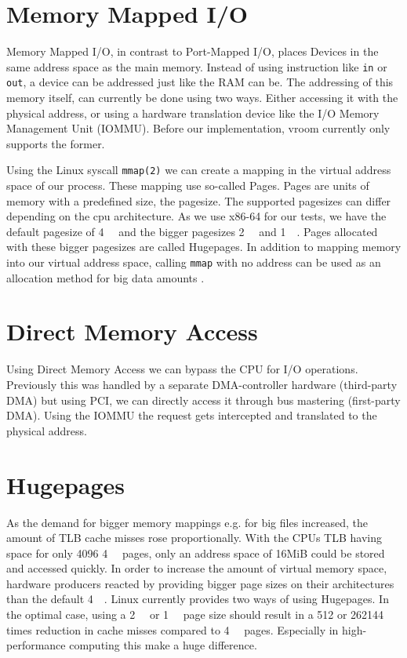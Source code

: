 \section{Memory Mapped I/O}
Memory Mapped I/O, in contrast to Port-Mapped I/O, places Devices in the same address space as the main memory. Instead of using instruction like \texttt{in} or \texttt{out}, a device can be addressed just like the RAM can be. The addressing of this memory itself, can currently be done using two ways. Either accessing it with the physical address, or using a hardware translation device like the I/O Memory Management Unit (IOMMU). Before our implementation, vroom currently only supports the former. %

Using the Linux syscall \texttt{mmap(2)} we can create a mapping in the virtual address space of our process. These mapping use so-called Pages. Pages are units of memory with a predefined size, the pagesize. The supported pagesizes can differ depending on the cpu architecture. As we use x86-64 for our tests, we have the default pagesize of \qty{4}{\kibi\byte} and the bigger pagesizes \qty{2}{\mebi\byte} and \qty{1}{\gibi\byte}. Pages allocated with these bigger pagesizes are called Hugepages. In addition to mapping memory into our virtual address space, calling \texttt{mmap} with no address can be used as an allocation method for big data amounts \cite{mmapmanpage}.

\section{Direct Memory Access}
Using Direct Memory Access we can bypass the CPU for I/O operations. Previously this was handled by a separate DMA-controller hardware (third-party DMA) but using PCI, we can directly access it through bus mastering (first-party DMA). Using the IOMMU the request gets intercepted and translated to the physical address.

\section{Hugepages}
As the demand for bigger memory mappings e.g. for big files increased, the amount of TLB cache misses rose proportionally. With the CPUs TLB having space for only 4096 \qty{4}{\kibi\byte} pages, only an address space of 16MiB could be stored and accessed quickly. In order to increase the amount of virtual memory space, hardware producers reacted by providing bigger page sizes on their architectures than the default \qty{4}{\kibi\byte}.
Linux currently provides two ways of using Hugepages.
In the optimal case, using a \qty{2}{\mebi\byte} or \qty{1}{\gibi\byte} page size should result in a 512 or 262144 times reduction in cache misses compared to \qty{4}{\kibi\byte} pages. Especially in high-performance computing this make a huge difference.

